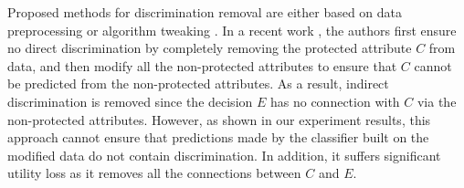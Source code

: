 \documentclass[letterpaper]{article}
\begin{document}
Proposed methods for discrimination removal are either based on data preprocessing \cite{kamiran2012data,zliobaite2011handling} or algorithm tweaking \cite{kamiran2010discrimination,calders2010three,kamishima2011fairness}. 
In a recent work \cite{feldman2015certifying}, the authors first ensure no direct discrimination by completely removing the protected attribute $C$ from data, and then modify all the non-protected attributes to ensure that $C$ cannot be predicted from the non-protected attributes. As a result, indirect discrimination is removed since the decision $E$ has no connection with $C$ via the non-protected attributes. However, as shown in our experiment results, this approach cannot ensure that predictions made by the classifier built on the modified data do not contain discrimination. In addition, it suffers significant utility loss as it removes all the connections between $C$ and $E$.


\end{document}
